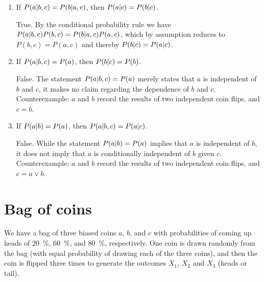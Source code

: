 \documentclass[11pt, a4paper]{article}
\begin{document}
\begin{enumerate}
    \item If $P(a \vert b, c) = P(b \vert a, c)$, then $P(a \vert c) = P(b \vert c)$.

    \begin{solution}
        True. By the conditional probability rule we have $P(a \vert b, c) P(b, c) = P(b \vert a, c) P(a, c)$, which by assumption reduces to $P(b, c) = P(a, c)$ and thereby $P(b \vert c) = P(a \vert c)$.
    \end{solution}

    \item If $P(a \vert b, c) = P(a)$, then $P(b \vert c) = P(b)$.

    \begin{solution}
        False. The statement $P(a \vert b, c) = P(a)$ merely states that $a$ is independent of $b$ and $c$, it makes no claim regarding the dependence of $b$ and $c$. Counterexample: $a$ and $b$ record the results of two independent coin flips, and $c = b$.
    \end{solution}

    \item If $P(a \vert b) = P(a)$, then $P(a \vert b, c) = P(a \vert c)$.

    \begin{solution}
        False. While the statement $P(a \vert b) = P(a)$ implies that $a$ is independent of $b$, it does not imply that $a$ is conditionally independent of $b$ given $c$. Counterexample: $a$ and $b$ record the results of two independent coin flips, and $c = a \vee b$.
    \end{solution}
\end{enumerate}

\newpage

\section{Bag of coins}

We have a bag of three biased coins $a$, $b$, and $c$ with probabilities of coming up heads of \qty{20}{\percent}, \qty{60}{\percent}, and \qty{80}{\percent}, respectively. One coin is drawn randomly from the bag (with equal probability of drawing each of the three coins), and then the coin is flipped three times to generate the outcomes $X_1$, $X_2$ and $X_3$ (heads or tail).
\end{document}
